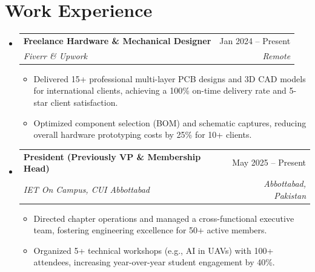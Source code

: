 \documentclass[letterpaper,10pt]{article}
\makeatletter
\newcommand{\resumeItem}[1]{\item\small{#1 \vspace{-2pt}}}
\newcommand{\resumeSubheading}[4]{
  \vspace{-1pt}\item
    \begin{tabular*}{0.97\textwidth}[t]{l@{\extracolsep{\fill}}r}
      \textbf{#1} & #2 \\
      \textit{\small#3} & \textit{\small #4} \\
    \end{tabular*}\vspace{-5pt}
}
\makeatother
\begin{document}
\section{Work Experience}
  \begin{itemize}[leftmargin=0.15in, label={}]
    
    \resumeSubheading
      {Freelance Hardware \& Mechanical Designer}{Jan 2024 -- Present}
      {Fiverr \& Upwork}{Remote}
      \begin{itemize}[leftmargin=0.15in, label=\textbullet]
        \resumeItem{Delivered 15+ professional multi-layer PCB designs and 3D CAD models for international clients, achieving a 100\% on-time delivery rate and 5-star client satisfaction.}
        \resumeItem{Optimized component selection (BOM) and schematic captures, reducing overall hardware prototyping costs by 25\% for 10+ clients.}
      \end{itemize}

    \resumeSubheading
      {President (Previously VP \& Membership Head)}{May 2025 -- Present}
      {IET On Campus, CUI Abbottabad}{Abbottabad, Pakistan}
      \begin{itemize}[leftmargin=0.15in, label=\textbullet]
        \resumeItem{Directed chapter operations and managed a cross-functional executive team, fostering engineering excellence for 50+ active members.}
        \resumeItem{Organized 5+ technical workshops (e.g., AI in UAVs) with 100+ attendees, increasing year-over-year student engagement by 40\%.}
      \end{itemize}

  \end{itemize}

\end{document}
